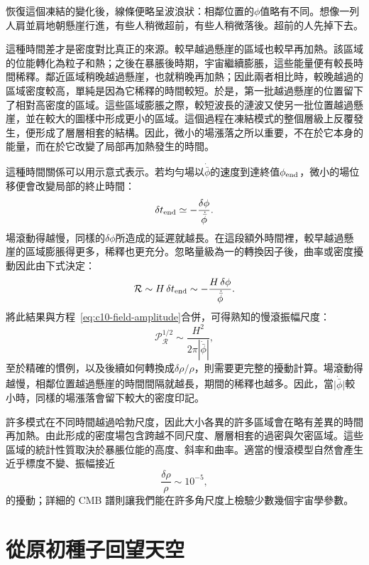 恢復這個凍結的變化後，線條便略呈波浪狀：相鄰位置的\(\phi\)值略有不同。想像一列人肩並肩地朝懸崖行進，有些人稍微超前，有些人稍微落後。超前的人先掉下去。

這種時間差才是密度對比真正的來源。較早越過懸崖的區域也較早再加熱。該區域的位能轉化為粒子和熱；之後在暴脹後時期，宇宙繼續膨脹，這些能量便有較長時間稀釋。鄰近區域稍晚越過懸崖，也就稍晚再加熱；因此兩者相比時，較晚越過的區域密度較高，單純是因為它稀釋的時間較短。於是，第一批越過懸崖的位置留下了相對高密度的區域。這些區域膨脹之際，較短波長的漣波又使另一批位置越過懸崖，並在較大的圖樣中形成更小的區域。這個過程在凍結模式的整個層級上反覆發生，便形成了層層相套的結構。因此，微小的場漲落之所以重要，不在於它本身的能量，而在於它改變了局部再加熱發生的時間。

這種時間關係可以用示意式表示。若均勻場以\(\dot{\bar\phi}\)的速度到達終值\(\phi_{\rm end}\)，微小的場位移便會改變局部的終止時間：
\begin{equation}
\delta t_{\rm end}
\simeq-\frac{\delta\phi}{\dot{\bar\phi}}.
\label{eq:c10-time-delay}
\end{equation}
場滾動得越慢，同樣的\(\delta\phi\)所造成的延遲就越長。在這段額外時間裡，較早越過懸崖的區域膨脹得更多，稀釋也更充分。忽略量級為一的轉換因子後，曲率或密度擾動因此由下式決定：
\begin{equation}
\mathcal R
\sim H\,\delta t_{\rm end}
\sim-\frac{H\,\delta\phi}{\dot{\bar\phi}}.
\label{eq:c10-curvature-estimate}
\end{equation}
將此結果與方程~\eqref{eq:c10-field-amplitude}合併，可得熟知的慢滾振幅尺度：
\begin{equation}
\mathcal P_{\mathcal R}^{1/2}
\sim\frac{H^2}{2\pi|\dot{\bar\phi}|},
\label{eq:c10-slow-roll-amplitude}
\end{equation}
至於精確的慣例，以及後續如何轉換成\(\delta\rho/\rho\)，則需要更完整的擾動計算。場滾動得越慢，相鄰位置越過懸崖的時間間隔就越長，期間的稀釋也越多。因此，當\(\lvert\dot{\bar\phi}\rvert\)較小時，同樣的場漲落會留下較大的密度印記。

許多模式在不同時間越過哈勃尺度，因此大小各異的許多區域會在略有差異的時間再加熱。由此形成的密度場包含跨越不同尺度、層層相套的過密與欠密區域。這些區域的統計性質取決於暴脹位能的高度、斜率和曲率。適當的慢滾模型自然會產生近乎標度不變、振幅接近
\[
\frac{\delta\rho}{\rho}\sim10^{-5},
\]
的擾動；詳細的 CMB 譜則讓我們能在許多角尺度上檢驗少數幾個宇宙學參數。

\section{從原初種子回望天空}

